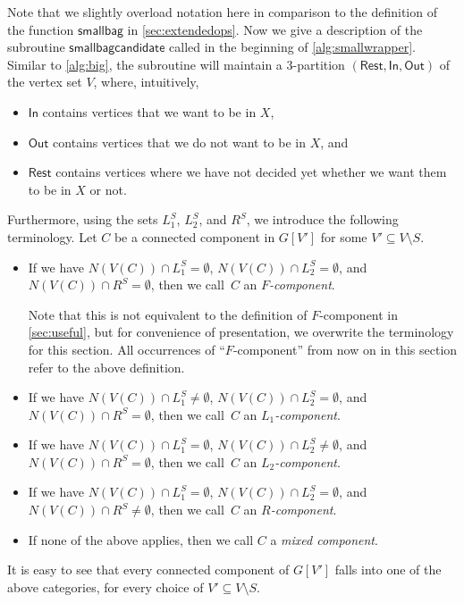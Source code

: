 \documentclass[a4paper,UKenglish,cleveref, autoref, thm-restate, numberwithinsect]{lipics-v2021}
\newcommand{\smallbag}{\mathsf{smallbag}}
\newcommand{\smallbagc}{\mathsf{smallbagcandidate}}
\newcommand{\In}{\mathsf{In}}
\newcommand{\Out}{\mathsf{Out}}
\newcommand{\Rest}{\mathsf{Rest}}
\begin{document}
Note that we slightly overload notation here in comparison to the definition of the function $\smallbag$ in \cref{sec:extendedops}.
Now we give a description of the subroutine $\smallbagc$ called in the beginning of \cref{alg:smallwrapper}.
Similar to \cref{alg:big}, the subroutine will maintain a 3-partition $(\Rest,\In,\Out)$ of the vertex set $V$, where, intuitively,
\begin{itemize}
    \item $\In$ contains vertices that we want to be in $X$,
    \item $\Out$ contains vertices that we do not want to be in $X$, and
    \item $\Rest$ contains vertices where we have not decided yet whether we want them to be in $X$ or not.
\end{itemize}
Furthermore, using the sets $L_1^S$, $L_2^S$, and $R^S$, we introduce the following terminology. 
Let $C$ be a connected component in $G[V']$ for some $V'\subseteq V\setminus S$. 
\begin{itemize}
    \item If we have $N(V(C))\cap L_1^S=\emptyset$, $N(V(C))\cap L_2^S=\emptyset$, and $N(V(C))\cap R^S=\emptyset$, 
    then we call~$C$ an \emph{$F$-component}. 
    
    Note that this is not equivalent to the definition of $F$-component in \cref{sec:useful}, but for convenience of presentation, we overwrite the terminology for this section.
    All occurrences of ``$F$-component'' from now on in this section refer to the above definition.
\item If we have $N(V(C))\cap L_1^S\neq\emptyset$, $N(V(C))\cap L_2^S=\emptyset$, and $N(V(C))\cap R^S=\emptyset$, 
    then we call~$C$ an \emph{$L_1$-component}.
    \item If we have $N(V(C))\cap L_1^S=\emptyset$, $N(V(C))\cap L_2^S\neq\emptyset$, and $N(V(C))\cap R^S=\emptyset$, 
    then we call~$C$ an \emph{$L_2$-component}.
    \item If we have $N(V(C))\cap L_1^S=\emptyset$, $N(V(C))\cap L_2^S=\emptyset$, and $N(V(C))\cap R^S\neq\emptyset$, 
    then we call~$C$ an \emph{$R$-component}.
    \item If none of the above applies, then we call $C$ a \emph{mixed component}.
\end{itemize}
It is easy to see that every connected component of $G[V']$ falls into one of the above categories, for every choice of $V'\subseteq V\setminus S$.
\end{document}
